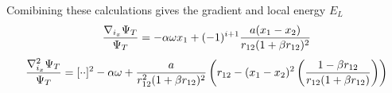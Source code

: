 Comibining these calculations gives the gradient and local energy $E_L$
\begin{equation}
  \frac{\nabla_{i_x}\Psi_T}{\Psi_T} =%
  -\alom x_1 + (-1)^{i+1}\frac{a(x_1 - x_2)}{r_{12}(1+\beta r_{12})^2}
\end{equation}
\begin{equation}
  \frac{\nabla^2_{i_x}\Psi_T}{\Psi_T} =%
  [\cdot\cdot]^2 -\alom +%
  \frac{a}{r_{12}^2(1+\beta r_{12})^2}%
  \left( r_{12} - (x_1-x_2)^2\left(\frac{1-\beta r_{12}}{r_{12}(1+\beta r_{12})}%
  \right)\right)
\end{equation}


